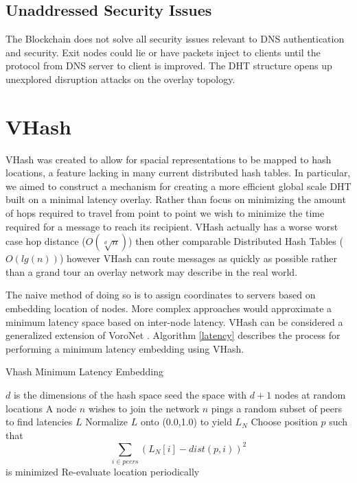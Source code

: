 \documentclass[11pt]{IEEEtran} %
\begin{document}
\subsection{Unaddressed Security Issues}
The Blockchain does not solve all security issues relevant to DNS authentication and security. Exit nodes could lie or have packets inject to clients until the protocol from DNS server to client is improved. The DHT structure opens up unexplored disruption attacks on the overlay topology.



\section{VHash}
VHash was created to allow for spacial representations to be mapped to hash locations, a feature lacking in many current distributed hash tables.  In particular, we aimed to construct a mechanism for creating a more efficient global scale DHT built on a minimal latency overlay. Rather than focus on minimizing the amount of hops required to travel from point to point we wish to minimize the time required for a message to reach its recipient. VHash actually has a worse worst case hop distance ($O(\sqrt[d]{n})$) then other comparable Distributed Hash Tables ($O(lg(n))$) however VHash can route messages as quickly as possible rather than a grand tour an overlay network may describe in the real world.

The naive method of doing so is to assign coordinates to servers based on embedding location of nodes. More complex approaches would approximate a minimum latency space based on inter-node latency. VHash can be considered  a generalized extension of VoroNet \cite{voronet}.  Algorithm \ref{latency} describes the process for performing a minimum latency embedding using VHash.









\begin{algorithm}
\caption{Vhash Minimum Latency Embedding}
\label{latency}
\begin{algorithmic}[1]  %
	\STATE $d$ is the dimensions of the hash space
    \STATE seed the space with $d+1$ nodes at random locations
   	\STATE A node $n$ wishes to join the network
    \STATE $n$ pings a random subset of peers to find latencies $L$
    \STATE Normalize $L$ onto (0.0,1.0) to yield $L_N$
    \STATE Choose position $p$ such that $$\sum\limits_{i\in peers}(L_N[i]-dist(p,i))^2$$ is minimized
    \STATE Re-evaluate location periodically
\end{algorithmic}
\end{algorithm}
\end{document}

